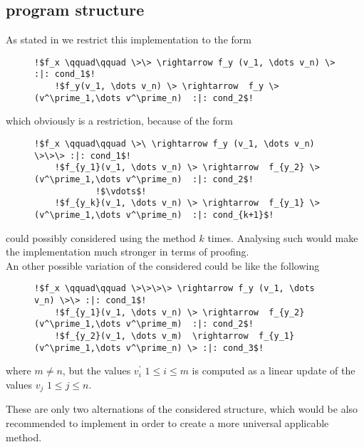 \subsection{\its program structure}
\label{sec:structure-improvement}
As stated in  we restrict this implementation to the form 
\begin{figure}[H]
	\begin{lstlisting}[escapechar=!]
	!$f_x \qquad\qquad \>\> \rightarrow f_y (v_1, \dots v_n) \> :|: cond_1$!
	!$f_y(v_1, \dots v_n) \> \rightarrow  f_y \>(v^\prime_1,\dots v^\prime_n)  :|: cond_2$!
	\end{lstlisting}
\end{figure}
which obviously is a restriction, because \itss of the form
\begin{figure}[H]
	\begin{lstlisting}[escapechar=!]
	!$f_x \qquad\qquad \>\ \rightarrow f_y (v_1, \dots v_n) \>\>\> :|: cond_1$!
	!$f_{y_1}(v_1, \dots v_n) \> \rightarrow  f_{y_2} \>(v^\prime_1,\dots v^\prime_n)  :|: cond_2$!
			!$\vdots$!
	!$f_{y_k}(v_1, \dots v_n) \> \rightarrow  f_{y_1} \>(v^\prime_1,\dots v^\prime_n)  :|: cond_{k+1}$!
	\end{lstlisting}
\end{figure}
could possibly considered using the method $k$ times. Analysing such \its would make the implementation much stronger in terms of proofing.
\\
An other possible variation of the considered \its could be like the following
\begin{figure}[H]
	\begin{lstlisting}[escapechar=!]
	!$f_x \qquad\qquad \>\>\>\> \rightarrow f_y (v_1, \dots v_n) \>\> :|: cond_1$!
	!$f_{y_1}(v_1, \dots v_n) \> \rightarrow  f_{y_2} (v^\prime_1,\dots v^\prime_m)  :|: cond_2$!
	!$f_{y_2}(v_1, \dots v_m)  \rightarrow  f_{y_1} (v^\prime_1,\dots v^\prime_n) \> :|: cond_3$!
	\end{lstlisting}
\end{figure}
where $m \ne n$, but the values $v^\prime_i$ $1 \le i \le m$ is computed as a linear update of the values $v_j$ $1 \le j \le n$.

These are only two alternations of the considered structure, which would be also recommended to implement in order to create a more universal applicable method.

